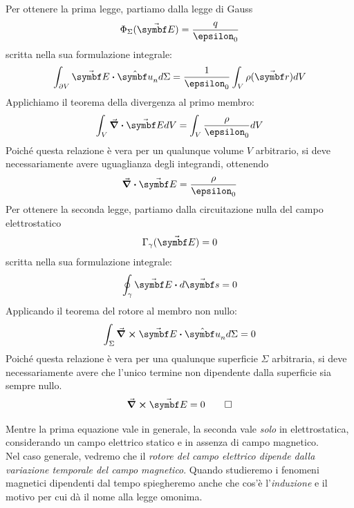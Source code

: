 \begin{demonstration}
	Per ottenere la prima legge, partiamo dalla legge di Gauss
	\begin{equation*}
		\Phi_\Sigma(\vba{E})=\frac{q}{\epsilon_0}
	\end{equation*}
scritta nella sua formulazione integrale:
	\begin{equation*}
		\int_{\partial V}\vba{E}\vdot\vbh{u}_nd\Sigma=\frac{1}{\epsilon_0}\int_{V}\rho(\vba{r})dV
	\end{equation*}
Applichiamo il teorema della divergenza al primo membro:
\begin{equation*}
	\int_V\div{\vba{E}}dV=\int_V\frac{\rho}{\epsilon_0}dV
\end{equation*}
Poiché questa relazione è vera per un qualunque volume $V$ arbitrario, si deve necessariamente avere uguaglianza degli integrandi, ottenendo
\begin{equation*}
	\div{\vba{E}}=\frac{\rho}{\epsilon_0}
\end{equation*}
Per ottenere la seconda legge, partiamo dalla circuitazione nulla del campo elettrostatico
\begin{equation*}
	\Gamma_{\gamma}(\vba{E})=0
\end{equation*}
scritta nella sua formulazione integrale:
\begin{equation*}
	\oint_{\gamma}\vba{E}\vdot d\vba{s}=0
\end{equation*}
Applicando il teorema del rotore al membro non nullo:
\begin{equation*}
	\int_{\Sigma}\curl{\vba{E}}\vdot \vbh{u}_nd\Sigma=0
\end{equation*}
Poiché questa relazione è vera per una qualunque superficie $\Sigma$ arbitraria, si deve necessariamente avere che l'unico termine non dipendente dalla superficie sia sempre nullo.
\begin{equation*}
	\curl{\vba{E}}=0\qedhere
\end{equation*}
\end{demonstration}
\begin{observe}
	Mentre la prima equazione vale in generale, la seconda vale \textit{solo} in elettrostatica, considerando un campo elettrico statico e in assenza di campo magnetico.\\
	Nel caso generale, vedremo che il \textit{rotore del campo elettrico dipende dalla variazione temporale del campo magnetico}. Quando studieremo i fenomeni magnetici dipendenti dal tempo spiegheremo anche che cos'è  l'\textit{induzione} e il motivo per cui dà il nome alla legge omonima.
\end{observe}


